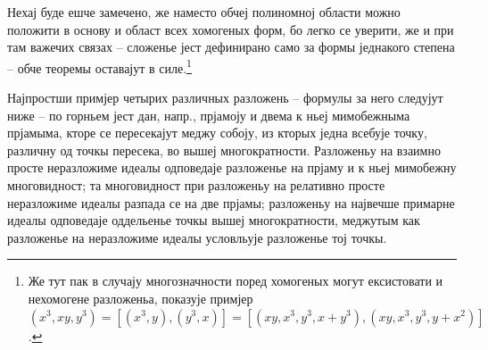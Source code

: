 ﻿\documentclass[11pt]{article}
\begin{document}
Нехај буде ешче замечено, же наместо обчеј полиномној области можно положити в основу и област всех хомогеных форм, бо легко се уверити, же и при там важечих связах -- сложенье јест дефинирано само за формы једнакого степена -- обче теоремы оставајут в силе.\footnote{Же тут пак в случају многозначности поред хомогеных могут ексистовати и нехомогене разложеньа, показује примјер \( (x^3,xy,y^3)=[(x^3,y),(y^3,x)]=[(xy,x^3,y^3,x+y^3),(xy,x^3,y^3,y+x^2)]\).}

Најпростши примјер четырих различных разложень -- формулы за него следујут ниже -- по горньем јест дан, напр., прјамоју и двема к ньеј мимобежныма прјамыма, кторе се пересекајут меджу собоју, из кторых једна всебује точку, различну од точкы пересека, во вышеј многократности. Разложеньу на взаимно просте неразложиме идеалы одповедаје разложенье на прјаму и к ньеј мимобежну многовидност; та многовидност при разложеньу на релативно просте неразложиме идеалы разпада се на две прјамы; разложеньу на највечше примарне идеалы одповедаје оддельенье точкы вышеј многократности, меджутым как разложенье на неразложиме идеалы условльује разложенье тој точкы.
\end{document}
